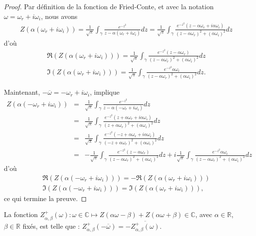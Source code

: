 \begin{proof}
  Par définition de la fonction de Fried-Conte, et avec la notation $\omega=\omega_r+i\omega_i$, nous avons
  \begin{eqnarray*}
    Z(\alpha(\omega_r+i\omega_i))=\frac{1}{\sqrt{\pi}}\int_\gamma\frac{e^{-z^2}}{z-\alpha(\omega_r+i\omega_i)}dz=\frac{1}{\sqrt{\pi}}\int_\gamma\frac{e^{-z^2}(z-\alpha\omega_r+i\alpha\omega_i)}{(z-\alpha\omega_r)^2+(\alpha\omega_i)^2}dz
  \end{eqnarray*}
  d'où
  \begin{eqnarray*}
    \Re\left(Z(\alpha(\omega_r+i\omega_i))\right)=\frac{1}{\sqrt{\pi}}\int_\gamma\frac{e^{-z^2}(z-\alpha\omega_r)}{(z-\alpha\omega_r)^2+(\alpha\omega_i)^2}dz\\
    \Im\left(Z(\alpha(\omega_r+i\omega_i))\right)=\frac{1}{\sqrt{\pi}}\int_\gamma\frac{e^{-z^2}\alpha\omega_i}{(z-\alpha\omega_r)^2+(\alpha\omega_i)^2}dz.
  \end{eqnarray*}

  Maintenant, $-\overline{\omega}=-\omega_r+i\omega_i$, implique
  \begin{eqnarray*}
    Z(\alpha(-\omega_r+i\omega_i))&=&\frac{1}{\sqrt{\pi}}\int_\gamma\frac{e^{-z^2}}{z-\alpha(-\omega_r+i\omega_i)}dz\\
    &=&\frac{1}{\sqrt{\pi}}\int_\gamma\frac{e^{-z^2}(z+\alpha\omega_r+i\alpha\omega_i)}{(z+\alpha\omega_r)^2+(\alpha\omega_i)^2}dz\\
    &=&\frac{1}{\sqrt{\pi}}\int_\gamma\frac{e^{-z^2}(-z+\alpha\omega_r+i\alpha\omega_i)}{(-z+\alpha\omega_r)^2+(\alpha\omega_i)^2}dz\\
    &=&-\frac{1}{\sqrt{\pi}}\int_\gamma\frac{e^{-z^2}(z-\alpha\omega_r)}{(z-\alpha\omega_r)^2+(\alpha\omega_i)^2}dz+i\frac{1}{\sqrt{\pi}}\int_\gamma\frac{e^{-z^2}\alpha\omega_i}{(z-\alpha\omega_r)^2+(\alpha\omega_i)^2}dz
  \end{eqnarray*}
  d'où
  \begin{eqnarray*}
    \Re\left(Z(\alpha(-\omega_r+i\omega_i))\right)=-\Re\left(Z(\alpha(\omega_r+i\omega_i))\right)\\
    \Im\left(Z(\alpha(-\omega_r+i\omega_i))\right)=\Im\left(Z(\alpha(\omega_r+i\omega_i))\right),
  \end{eqnarray*}
  ce qui termine la preuve.
\end{proof}


\begin{lemma}
  La fonction $Z_{\alpha,\beta}^+(\omega):\omega\in\mathbb{C}\mapsto Z\left(\alpha\omega-\beta\right)+Z\left(\alpha\omega+\beta\right)\in\mathbb{C}$, avec $\alpha\in\mathbb{R}$, $\beta\in\mathbb{R}$ fixés, est telle que : $Z_{\alpha,\beta}^+\left(-\overline{\omega}\right)=-\overline{Z_{\alpha,\beta}^+(\omega)}$.
\end{lemma}
  
